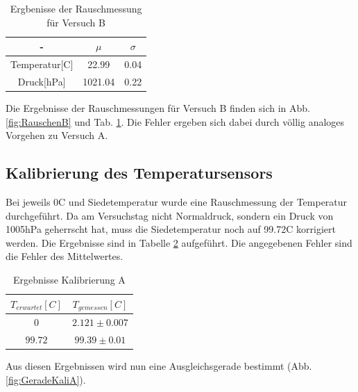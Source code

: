 \documentclass[12pt,a4paper]{article}
\begin{document}
\begin{table}[H]
\begin{center}
\begin{tabular}{|c|c|c|}
\hline 
- & $\mu$ & $\sigma$\\ 
\hline 
Temperatur[C] & 22.99 & 0.04 \\ 
\hline 
Druck[hPa] & 1021.04 & 0.22\\ 
\hline 
\end{tabular}
\caption[Tabelle Rauschenmessung B]{Ergbenisse der Rauschmessung für Versuch B}
\label{tab:RauschenB}
\end{center}
\end{table}

Die Ergebnisse der Rauschmessungen für Versuch B finden sich in Abb. \ref{fig:RauschenB} und Tab. \ref{tab:RauschenB}. Die Fehler ergeben sich dabei durch völlig analoges Vorgehen zu Versuch A.



\subsection{Kalibrierung des Temperatursensors}

Bei jeweils 0C und Siedetemperatur wurde eine Rauschmessung der Temperatur durchgeführt. Da am Versuchstag nicht Normaldruck, sondern ein Druck von 1005hPa geherrscht hat, muss die Siedetemperatur noch auf 99.72C korrigiert werden. Die Ergebnisse sind in Tabelle \ref{tab:KaliA} aufgeführt. Die angegebenen Fehler sind die Fehler des Mittelwertes.

\begin{table}[H]
\begin{center}
\begin{tabular}{|c|c|}
\hline 
$T_{erwartet}[C]$ & $T_{gemessen}[C]$ \\ 
\hline 
$0$ & $2.121\pm0.007$ \\ 
\hline 
$99.72$ & $99.39\pm0.01$ \\ 
\hline 
\end{tabular}
\caption[Ergebnisse Kalibrierung A]{Ergebnisse Kalibrierung A} 
\label{tab:KaliA}
\end{center}
\end{table}

Aus diesen Ergebnissen wird nun eine Ausgleichsgerade bestimmt (Abb.\ref{fig:GeradeKaliA}).
\end{document}
